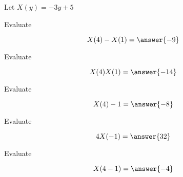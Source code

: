 \documentclass{ximera}
\author{Lee Wayand}
\begin{document}
\begin{exercise}





Let $X(y) = -3y + 5$ \\







\begin{question}


Evaluate  

\[
X(4)-X(1) = \answer{-9}
\]


\end{question}








\begin{question}


Evaluate  

\[
X(4)X(1) = \answer{-14}
\]


\end{question}









\begin{question}


Evaluate  

\[
X(4)-1 = \answer{-8}
\]


\end{question}








\begin{question}


Evaluate  

\[
4 X(-1) = \answer{32}
\]


\end{question}










\begin{question}


Evaluate  

\[
X(4-1) = \answer{-4}
\]


\end{question}








\end{exercise}
\end{document}
